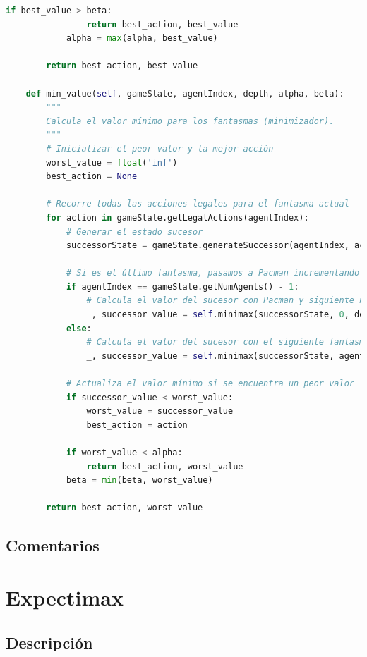 \documentclass{report}
\begin{document}
\begin{lstlisting}[language=Python, caption=Implementación final del agente Alpha-Beta]
            if best_value > beta:
                return best_action, best_value
            alpha = max(alpha, best_value)

        return best_action, best_value

    def min_value(self, gameState, agentIndex, depth, alpha, beta):
        """
        Calcula el valor mínimo para los fantasmas (minimizador).
        """
        # Inicializar el peor valor y la mejor acción
        worst_value = float('inf')
        best_action = None

        # Recorre todas las acciones legales para el fantasma actual
        for action in gameState.getLegalActions(agentIndex):
            # Generar el estado sucesor
            successorState = gameState.generateSuccessor(agentIndex, action)
            
            # Si es el último fantasma, pasamos a Pacman incrementando la profundidad
            if agentIndex == gameState.getNumAgents() - 1:
                # Calcula el valor del sucesor con Pacman y siguiente nivel de profundidad
                _, successor_value = self.minimax(successorState, 0, depth + 1, alpha, beta)
            else:
                # Calcula el valor del sucesor con el siguiente fantasma
                _, successor_value = self.minimax(successorState, agentIndex + 1, depth, alpha, beta)

            # Actualiza el valor mínimo si se encuentra un peor valor
            if successor_value < worst_value:
                worst_value = successor_value
                best_action = action
                
            if worst_value < alpha:
                return best_action, worst_value
            beta = min(beta, worst_value)

        return best_action, worst_value
            \end{lstlisting}
        \subsection*{Comentarios}
          \paragraph*{}{

          }
      \clearpage\section{Expectimax}
        \subsection*{Descripción}
\end{document}
